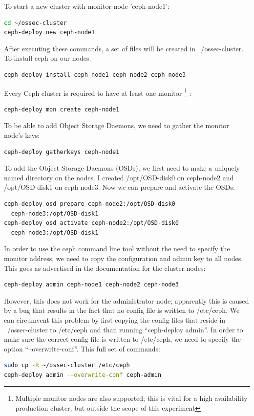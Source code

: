 \documentclass[12pt]{report}
\begin{document}
To start a new cluster with monitor node 'ceph-node1':
\begin{lstlisting}[language=bash]
cd ~/ossec-cluster
ceph-deploy new ceph-node1
\end{lstlisting}
After executing these commands, a set of files will be created in
~/ossec-cluster.
To install ceph on our nodes:
\begin{lstlisting}[language=bash]
ceph-deploy install ceph-node1 ceph-node2 ceph-node3
\end{lstlisting}
Every Ceph cluster is required to have at least one monitor
\footnote{Multiple monitor nodes are also supported; this is vital for a high
  availability production cluster, but outside the scope of this experiment} :
\begin{lstlisting}[language=bash]
ceph-deploy mon create ceph-node1
\end{lstlisting}
To be able to add Object Storage Daemons, we need to gather the
monitor node's
keys:
\begin{lstlisting}[language=bash]
ceph-deploy gatherkeys ceph-node1
\end{lstlisting}
To add the Object Storage Daemons (OSDs), we first need to make a uniquely
named directory on the nodes. I created /opt/OSD-disk0 on ceph-node2 and
/opt/OSD-disk1 on ceph-node3. 
Now we can prepare and activate the OSDs:
\begin{lstlisting}[language=bash]
ceph-deploy osd prepare ceph-node2:/opt/OSD-disk0 
  ceph-node3:/opt/OSD-disk1
ceph-deploy osd activate ceph-node2:/opt/OSD-disk0 
  ceph-node3:/opt/OSD-disk1
\end{lstlisting}

In order to use the ceph command line tool without the need to specify
the monitor address, we need to copy the configuration and admin key
to all nodes.
This goes as advertised in the documentation for the cluster nodes:
\begin{lstlisting}[language=bash]
ceph-deploy admin ceph-node1 ceph-node2 ceph-node3 
\end{lstlisting}
However, this does not work for the administrator node; apparently
this is caused by a bug \cite{ceph_bug_1} that results in the fact
that no config file is written to /etc/ceph.
We can circumvent this problem by first copying the config files that
reside in ~/ossec-cluster to /etc/ceph and than running ``ceph-deploy
admin''.
In order to make sure the correct config file is written to /etc/ceph,
we need to specify the option ``--overwrite-conf''.
This full set of commands:
\begin{lstlisting}[language=bash]
sudo cp -R ~/ossec-cluster /etc/ceph
ceph-deploy admin --overwrite-conf ceph-admin
\end{lstlisting}
\end{document}
